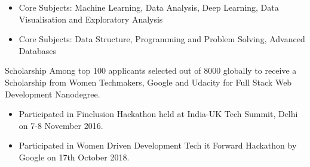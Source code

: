
\begin{itemize}
\item Core Subjects: Machine Learning, Data Analysis, Deep Learning, Data Visualisation and Exploratory Analysis
\end{itemize}
\divider

\begin{itemize}
\item Core Subjects: Data Structure, Programming and Problem Solving, Advanced Databases
\end{itemize}

\divider



\cvachievement{\faTrophy}
{Scholarship}
{ Among top 100 applicants selected out of 8000 globally to receive a Scholarship from Women Techmakers, Google and Udacity for Full Stack Web Development Nanodegree.}
\divider

{\begin{itemize}
\item Participated in Finclusion Hackathon held at India-UK Tech Summit, Delhi on 7-8 November 2016. 
\item Participated in Women Driven Development Tech it Forward Hackathon by Google on 17th October 2018.   
\end{itemize}}


\divider







